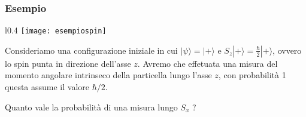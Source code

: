 \subsubsection{Esempio}

\begin{wrapfigure}{l}{0.4\textwidth} %
    \centering
    \texttt{[image: esempiospin]} %
\end{wrapfigure}
Consideriamo una configurazione iniziale in cui $| \psi \rangle = |+ \rangle $ e $S_z|+ \rangle  = \frac{\hbar}{2} |+ \rangle $, ovvero lo spin punta in direzione dell'asse $z$. Avremo che effetuata una misura del momento angolare intrinseco della particella lungo l'asse $z$, con probabilit\`a 1 questa assume il valore $\hbar /2$.

Quanto vale la probabilit\`a di una misura lungo $S_x$ ?
\newline

